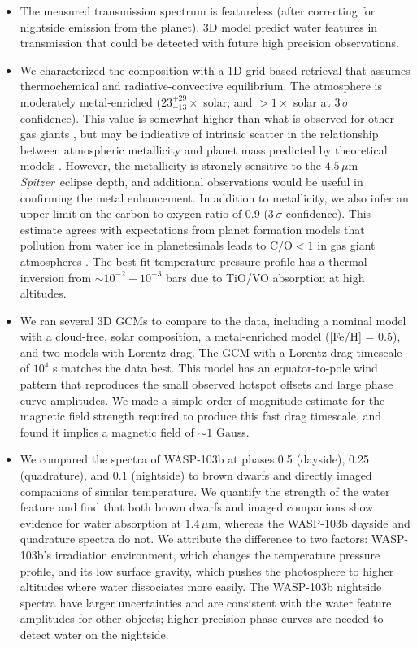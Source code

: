 \documentclass[twocolumn, trackchanges]{aastex61}
\newcommand{\project}[1]{\textsl{#1}}
\newcommand{\Spitzer}{\project{Spitzer}}
\begin{document}
\begin{itemize}
\item{The measured transmission spectrum is featureless (after correcting for nightside emission from the planet). 3D model predict water features in transmission that could be detected with future high precision observations.}
	\item{We characterized the composition with a 1D grid-based retrieval that assumes thermochemical and radiative-convective equilibrium. The atmosphere is moderately metal-enriched ($23^{+29}_{-13}\times$ solar; and $>1\times$ solar at $3\,\sigma$ confidence). This value is somewhat higher than what is observed for other gas giants \citep[e.g.][]{wong04, kreidberg14b}, but may be indicative of intrinsic scatter in the relationship between atmospheric metallicity and planet mass predicted by theoretical models \citep{fortney13, mordasini16}. However, the metallicity is strongly sensitive to the $4.5\,\mu$m \Spitzer\ eclipse depth, and additional observations would be useful in confirming the metal enhancement.  In addition to metallicity, we also infer an upper limit on the carbon-to-oxygen ratio of 0.9 ($3\,\sigma$ confidence). This estimate agrees with expectations from planet formation models that pollution from water ice in planetesimals leads to $\mathrm{C/O} < 1$ in gas giant atmospheres \citep{mordasini16, espinoza17}. The best fit temperature pressure profile has a thermal inversion from $\sim10^{-2} - 10^{-3}$ bars due to TiO/VO absorption at high altitudes.} 
	\item{We ran several 3D GCMs to compare to the data, including a nominal model with a cloud-free, solar composition, a metal-enriched model ([Fe/H] = 0.5), and two models with Lorentz drag. The GCM with a Lorentz drag timescale of $10^4$ s matches the data best. This model has an equator-to-pole wind pattern that reproduces the small observed hotspot offsets and large phase curve amplitudes. We made a simple order-of-magnitude estimate for the magnetic field strength required to produce this fast drag timescale, and found it implies a magnetic field of $\sim1$ Gauss.}
	\item{We compared the spectra of WASP-103b at phases 0.5 (dayside), 0.25 (quadrature), and 0.1 (nightside) to brown dwarfs and directly imaged companions of similar temperature. We quantify the strength of the water feature and find that both brown dwarfs and imaged companions show evidence for water absorption at $1.4\,\mu$m, whereas the WASP-103b dayside and quadrature spectra do not. We attribute the difference to two factors: WASP-103b's irradiation environment, which changes the temperature pressure profile, and its low surface gravity, which pushes the photosphere to higher altitudes where water dissociates more easily. The WASP-103b nightside spectra have larger uncertainties and are consistent with the water feature amplitudes for other objects; higher precision phase curves are needed to detect water on the nightside.}
\end{itemize}
\end{document}
